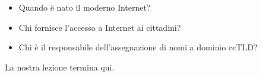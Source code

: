 \begin{itemize}
     \item Quando è nato il moderno Internet? 
     \item Chi fornisce l'accesso a Internet ai cittadini? 
     \item Chi è il responsabile dell'assegnazione di nomi a dominio ccTLD? 
     
 \end{itemize}
    La nostra lezione termina qui. 